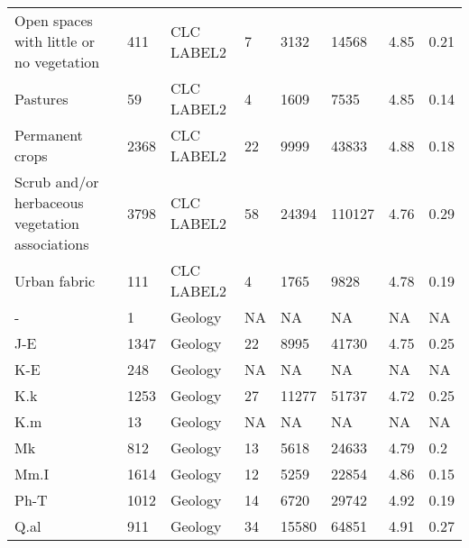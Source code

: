 \begin{sidewaystable*}
\begin{tabular*}{\textwidth}{@{\extracolsep{\fill}}llllllll@{\extracolsep{\fill}}}
Open spaces with little or no vegetation        & 411  & CLC LABEL2           & 7       & 3132           & 14568         & 4.85          & 0.21        \\
Pastures                                        & 59   & CLC LABEL2           & 4       & 1609           & 7535          & 4.85          & 0.14        \\
Permanent crops                                 & 2368 & CLC LABEL2           & 22      & 9999           & 43833         & 4.88          & 0.18        \\
Scrub and/or herbaceous vegetation associations & 3798 & CLC LABEL2           & 58      & 24394          & 110127        & 4.76          & 0.29        \\
Urban fabric                                    & 111  & CLC LABEL2           & 4       & 1765           & 9828          & 4.78          & 0.19        \\
-                                               & 1    & Geology              & NA      & NA             & NA            & NA            & NA          \\
J-E                                             & 1347 & Geology              & 22      & 8995           & 41730         & 4.75          & 0.25        \\
K-E                                             & 248  & Geology              & NA      & NA             & NA            & NA            & NA          \\
K.k                                             & 1253 & Geology              & 27      & 11277          & 51737         & 4.72          & 0.25        \\
K.m                                             & 13   & Geology              & NA      & NA             & NA            & NA            & NA          \\
Mk                                              & 812  & Geology              & 13      & 5618           & 24633         & 4.79          & 0.2         \\
Mm.I                                            & 1614 & Geology              & 12      & 5259           & 22854         & 4.86          & 0.15        \\
Ph-T                                            & 1012 & Geology              & 14      & 6720           & 29742         & 4.92          & 0.19        \\
Q.al                                            & 911  & Geology              & 34      & 15580          & 64851         & 4.91          & 0.27        \\

\end{tabular*}
\end{sidewaystable*}

